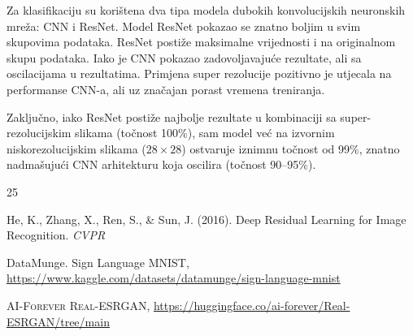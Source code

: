 \documentclass[a4paper,twocolumn]{article}
\begin{document}
Za klasifikaciju su korištena dva tipa modela dubokih konvolucijskih neuronskih mreža: CNN i ResNet. Model ResNet pokazao se znatno boljim u svim skupovima podataka. ResNet postiže maksimalne vrijednosti i na originalnom skupu podataka. Iako je CNN pokazao zadovoljavajuće rezultate, ali sa oscilacijama u rezultatima. Primjena super rezolucije pozitivno je utjecala na performanse CNN-a, ali uz značajan porast vremena treniranja.

Zaključno, iako ResNet postiže najbolje rezultate u kombinaciji sa super-rezolucijskim slikama (točnost 100\%), sam model već na izvornim niskorezolucijskim slikama ($28\times28$) ostvaruje iznimnu točnost od 99\%, znatno nadmašujući CNN arhitekturu koja oscilira (točnost 90--95\%).


\begin{thebibliography}{25}







He, K., Zhang, X., Ren, S., \& Sun, J. (2016). Deep Residual Learning for Image Recognition. \textit{CVPR}

DataMunge. 
Sign Language MNIST,
\url{https://www.kaggle.com/datasets/datamunge/sign-language-mnist}

    \textsc{AI-Forever Real-ESRGAN}, \url{https://huggingface.co/ai-forever/Real-ESRGAN/tree/main}

\end{thebibliography}
\end{document}
